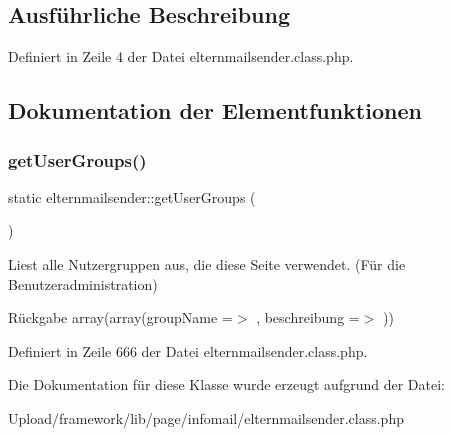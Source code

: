 \subsection{Ausführliche Beschreibung}


Definiert in Zeile 4 der Datei elternmailsender.\+class.\+php.



\subsection{Dokumentation der Elementfunktionen}
\mbox{\label{classelternmailsender_af90d3c178b44724c1562d99d64cd7f04}} 
\subsubsection{\texorpdfstring{get\+User\+Groups()}{getUserGroups()}}
{\footnotesize\ttfamily static elternmailsender\+::get\+User\+Groups (\begin{DoxyParamCaption}{ }\end{DoxyParamCaption})\hspace{0.3cm}{\ttfamily [static]}}

Liest alle Nutzergruppen aus, die diese Seite verwendet. (Für die Benutzeradministration) \begin{DoxyReturn}{Rückgabe}
array(array(\textquotesingle{}group\+Name\textquotesingle{} =$>$ \textquotesingle{}\textquotesingle{}, \textquotesingle{}beschreibung\textquotesingle{} =$>$ \textquotesingle{}\textquotesingle{})) 
\end{DoxyReturn}


Definiert in Zeile 666 der Datei elternmailsender.\+class.\+php.



Die Dokumentation für diese Klasse wurde erzeugt aufgrund der Datei\+:\begin{DoxyCompactItemize}
\item 
Upload/framework/lib/page/infomail/elternmailsender.\+class.\+php\end{DoxyCompactItemize}
